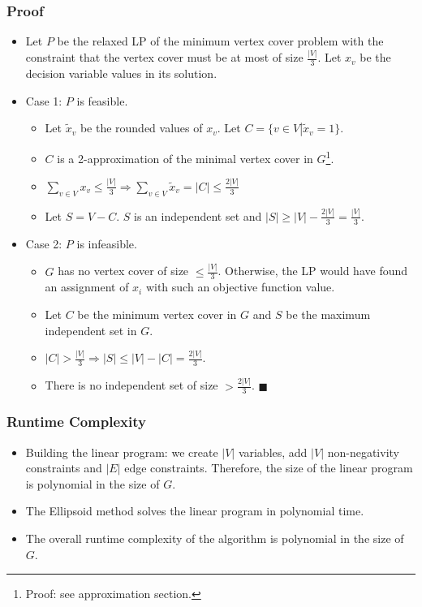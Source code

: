 \documentclass[12pt]{article}
\begin{document}
\subsubsection*{Proof}
\begin{itemize}
	\item Let $P$ be the relaxed LP of the minimum vertex cover problem with the constraint that the vertex cover must be at most of size $\frac{|V|}{3}$. Let $x_v$ be the decision variable values in its solution.
	\item Case 1: $P$ is feasible.
	\begin{itemize}
		\item Let $\tilde{x}_v$ be the rounded values of $x_v$. Let $C = \{v \in V \left.\right| \tilde{x}_v = 1\}$.
		\item $C$ is a 2-approximation of the minimal vertex cover in $G$\footnote{Proof: see approximation section.}.
		\item $\sum_{v \in V} x_v \leq \frac{|V|}{3} \Rightarrow \sum_{v \in V} \tilde{x}_v = |C| \leq \frac{2 |V|}{3}$
		\item Let $S = V - C$. $S$ is an independent set and $|S| \geq |V| - \frac{2 |V|}{3} = \frac{|V|}{3}$.
	\end{itemize}
	\item Case 2: $P$ is infeasible.
	\begin{itemize}
		\item $G$ has no vertex cover of size $\leq \frac{|V|}{3}$. Otherwise, the LP would have found an assignment of $x_i$ with such an objective function value. 
		\item Let $C$ be the minimum vertex cover in $G$ and $S$ be the maximum independent set in $G$.
		\item $|C| > \frac{|V|}{3} \Rightarrow |S| \leq |V| - |C| = \frac{2 |V|}{3}$.
		\item There is no independent set of size $> \frac{2 |V|}{3}$. \hfill $\blacksquare$
	\end{itemize}
\end{itemize}

\subsubsection*{Runtime Complexity}
\begin{itemize}
	\item Building the linear program: we create $|V|$ variables, add $|V|$ non-negativity constraints and $|E|$ edge constraints. Therefore, the size of the linear program is polynomial in the size of $G$.
	\item The Ellipsoid method solves the linear program in polynomial time.
	\item The overall runtime complexity of the algorithm is polynomial in the size of $G$.
\end{itemize}
\end{document}
